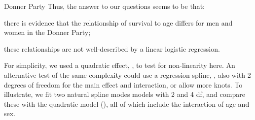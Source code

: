 \documentclass[11pt]{book}\usepackage[]{graphicx}\usepackage[]{color}
\begin{document}
\begin{Example}[donner1]{Donner Party}
Thus, the answer to our questions seems to be that:
\begin{seriate}
 \item there is evidence that the relationship of survival to age differs
 for men and women in the Donner Party;
 \item these relationships are not well-described by a linear logistic
 regression.
\end{seriate}

For simplicity, we used a quadratic effect, , to test for
non-linearity here.  An alternative test of the same complexity 
could use a regression spline, , also with 2 degrees of
freedom for the main effect and interaction, or allow more knots.
To illustrate, we fit two natural spline modes models with 2 and 4 df,
and compare these with the quadratic model (),
all of which include the interaction of age and sex.


\end{Example}
\end{document}
